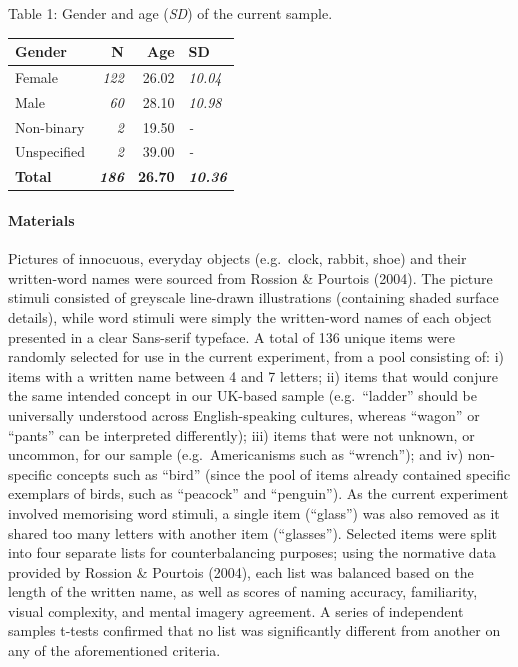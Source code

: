 \documentclass[
  11pt,
]{article}
\begin{document}
Table 1: Gender and age (\emph{SD}) of the current sample.

\begin{table}[!h]
\centering
\begin{tabular}{l>{}rr>{}l}
\toprule
Gender & N & Age & SD\\
\midrule
Female & \em{122} & 26.02 & \em{10.04}\\
Male & \em{60} & 28.10 & \em{10.98}\\
Non-binary & \em{2} & 19.50 & \em{-}\\
Unspecified & \em{2} & 39.00 & \em{-}\\
\textbf{Total} & \textbf{\em{186}} & \textbf{26.70} & \textbf{\em{10.36}}\\
\bottomrule
\end{tabular}
\end{table}

\hypertarget{materials}{%
\paragraph{Materials}\label{materials}}

\hfill\break Pictures of innocuous, everyday objects (e.g.~clock,
rabbit, shoe) and their written-word names were sourced from Rossion \&
Pourtois (2004). The picture stimuli consisted of greyscale line-drawn
illustrations (containing shaded surface details), while word stimuli
were simply the written-word names of each object presented in a clear
Sans-serif typeface. A total of 136 unique items were randomly selected
for use in the current experiment, from a pool consisting of: i) items
with a written name between 4 and 7 letters; ii) items that would
conjure the same intended concept in our UK-based sample
(e.g.~``ladder'' should be universally understood across
English-speaking cultures, whereas ``wagon'' or ``pants'' can be
interpreted differently); iii) items that were not unknown, or uncommon,
for our sample (e.g.~Americanisms such as ``wrench''); and iv)
non-specific concepts such as ``bird'' (since the pool of items already
contained specific exemplars of birds, such as ``peacock'' and
``penguin''). As the current experiment involved memorising word
stimuli, a single item (``glass'') was also removed as it shared too
many letters with another item (``glasses''). Selected items were split
into four separate lists for counterbalancing purposes; using the
normative data provided by Rossion \& Pourtois (2004), each list was
balanced based on the length of the written name, as well as scores of
naming accuracy, familiarity, visual complexity, and mental imagery
agreement. A series of independent samples t-tests confirmed that no
list was significantly different from another on any of the
aforementioned criteria.
\end{document}
